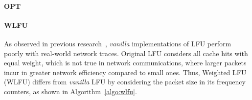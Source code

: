 \paragraph{OPT}

\paragraph{WLFU}
As observed in previous research~\cite{Kim:09}, \textit{vanilla} implementations of LFU perform poorly with real-world network traces.
Original LFU considers all cache hits with equal weight, which is not true in network communications, where larger packets incur in greater network efficiency compared to small ones.
Thus, Weighted LFU (WLFU) differs from \textit{vanilla} LFU by considering the packet size in its frequency counters, as shown in Algorithm~\ref{algo:wlfu}.

%
%
%
%	
%
%
%	


